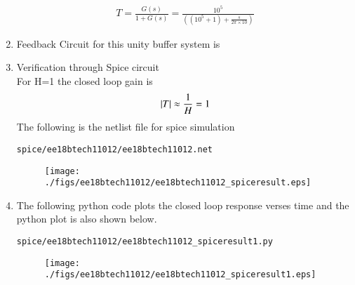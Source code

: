 \begin{enumerate}[label=\thesubsection.\arabic*.,ref=\thesubsection.\theenumi]
\begin{align}
    T = \frac{G(s)}{1+G(s)} = \frac{10^5}{((10^5+1)+\frac{s}{2\pi\times10})}
\end{align}
\item Feedback Circuit for this unity buffer system is
\\
\solution
\begin{figure}[ht!]
	\begin{center}
		\resizebox{\columnwidth}{!}{}
	\end{center}
	\caption{}
	\label{fig:ee18btech11012_fig2}
\end{figure}
\item Verification through Spice circuit
\\
\solution For H=1 the closed loop gain is
\begin{align}
    \left\vert T\right\vert \approx \frac{1}{H} = 1
\end{align}
The following is the netlist file for spice simulation
\begin{lstlisting}
spice/ee18btech11012/ee18btech11012.net
\end{lstlisting}
\begin{figure}[!h]
\centering
\texttt{[image: ./figs/ee18btech11012/ee18btech11012\_spiceresult.eps]}
\caption{}
\label{fig:ee18btech11012_spice_result}
\end{figure}
\item The following python code plots the closed loop response verses time and the python plot is also shown below.
\begin{lstlisting}
spice/ee18btech11012/ee18btech11012_spiceresult1.py
\end{lstlisting}
\begin{figure}[!h]
\centering
\texttt{[image: ./figs/ee18btech11012/ee18btech11012\_spiceresult1.eps]}
\caption{}
\label{fig:ee18btech11012_spice_result1}
\end{figure}

\end{enumerate}
